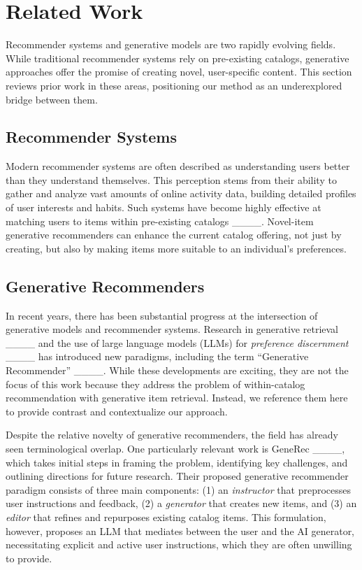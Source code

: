 \section{Related Work}
Recommender systems and generative models are two rapidly evolving fields. While traditional recommender systems rely on pre-existing catalogs, generative approaches offer the promise of creating novel, user-specific content. This section reviews prior work in these areas, positioning our method as an underexplored bridge between them.


\subsection{Recommender Systems}
Modern recommender systems are often described as understanding users better than they understand themselves. This perception stems from their ability to gather and analyze vast amounts of online activity data, building detailed profiles of user interests and habits. Such systems have become highly effective at matching users to items within pre-existing catalogs ____.  Novel-item generative recommenders can enhance the current catalog offering, not just by creating, but also by making items more suitable to an individual's preferences.

\subsection{Generative Recommenders}
In recent years, there has been substantial progress at the intersection of generative models and recommender systems. Research in generative retrieval ____ and the use of large language models (LLMs) for \textit{preference discernment} ____ has introduced new paradigms, including the term ``Generative Recommender'' ____. While these developments are exciting, they are not the focus of this work because they address the problem of within-catalog recommendation with generative item retrieval. Instead, we reference them here to provide contrast and contextualize our approach.

Despite the relative novelty of generative recommenders, the field has already seen terminological overlap. One particularly relevant work is GeneRec ____, which takes initial steps in framing the problem, identifying key challenges, and outlining directions for future research. Their proposed generative recommender paradigm consists of three main components: (1) an \textit{instructor} that preprocesses user instructions and feedback, (2) a \textit{generator} that creates new items, and (3) an \textit{editor} that refines and repurposes existing catalog items. This formulation, however, proposes an LLM that mediates between the user and the AI generator, necessitating explicit and active user instructions, which they are often unwilling to provide.


